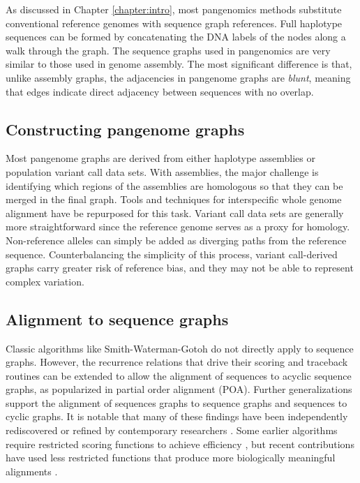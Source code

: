 \documentclass[11pt]{ucthesis}
\begin{document}
As discussed in Chapter \ref{chapter:intro}, most pangenomics methods substitute conventional reference genomes with sequence graph references. Full haplotype sequences can be formed by concatenating the DNA labels of the nodes along a walk through the graph. The sequence graphs used in pangenomics are very similar to those used in genome assembly. The most significant difference is that, unlike assembly graphs, the adjacencies in pangenome graphs are \emph{blunt}, meaning that edges indicate direct adjacency between sequences with no overlap.

\subsection{Constructing pangenome graphs}

Most pangenome graphs are derived from either haplotype assemblies or population variant call data sets. With assemblies, the major challenge is identifying which regions of the assemblies are homologous so that they can be merged in the final graph. Tools and techniques for interspecific whole genome alignment have be repurposed for this task\cite{armstrong2020progressive,li2020design,minkin2020scalable}. Variant call data sets are generally more straightforward since the reference genome serves as a proxy for homology. Non-reference alleles can simply be added as diverging paths from the reference sequence\cite{rakocevic2019fast,garrison2018variation}. Counterbalancing the simplicity of this process, variant call-derived graphs carry greater risk of reference bias, and they may not be able to represent complex variation.

\subsection{Alignment to sequence graphs}

Classic algorithms like Smith-Waterman-Gotoh\cite{smith1981comparison} do not directly apply to sequence graphs.
However, the recurrence relations that drive their scoring and traceback routines can be extended to allow the alignment of sequences to acyclic sequence graphs, as popularized in partial order alignment (POA)\cite{lee2002multiple}.
Further generalizations support the alignment of sequences graphs to sequence graphs\cite{grasso2004combining} and sequences to cyclic graphs\cite{navarro2000improved,myers1989approximate,amir1997pattern}.
It is notable that many of these findings have been independently rediscovered or refined by contemporary researchers \cite{antipov2015hybridspades,rautiainen2017aligning,jain2020complexity}.
Some earlier algorithms require restricted scoring functions to achieve efficiency \cite{rautiainen2017aligning}, but recent contributions have used less restricted functions that produce more biologically meaningful alignments \cite{jain2020complexity}.
\end{document}
